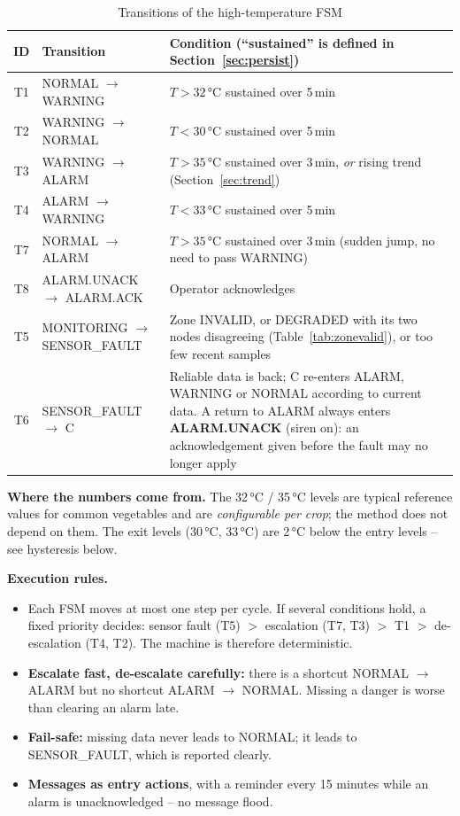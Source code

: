 \documentclass[11pt,a4paper]{report}
\newcommand{\why}[1]{\par\noindent\colorbox{gray!10}{\parbox{\dimexpr\linewidth-2\fboxsep}{\small\textbf{Where the numbers come from.} #1}}\par}
\begin{document}
\begin{table}[htbp]
\centering
\caption{Transitions of the high-temperature FSM}\label{tab:trans}
\small
\begin{tabularx}{\textwidth}{c >{\raggedright\arraybackslash}p{4.3cm} Y}
\toprule
\textbf{ID} & \textbf{Transition} & \textbf{Condition (``sustained'' is defined in Section~\ref{sec:persist})}\\
\midrule
T1 & NORMAL $\to$ WARNING & $T > 32$\,°C sustained over 5\,min\\
T2 & WARNING $\to$ NORMAL & $T < 30$\,°C sustained over 5\,min\\
T3 & WARNING $\to$ ALARM & $T > 35$\,°C sustained over 3\,min, \emph{or} rising trend (Section~\ref{sec:trend})\\
T4 & ALARM $\to$ WARNING & $T < 33$\,°C sustained over 5\,min\\
T7 & NORMAL $\to$ ALARM & $T > 35$\,°C sustained over 3\,min (sudden jump, no need to pass WARNING)\\
T8 & ALARM.UNACK $\to$ ALARM.ACK & Operator acknowledges\\
T5 & MONITORING $\to$ SENSOR\_FAULT & Zone INVALID, or DEGRADED with its two nodes disagreeing (Table~\ref{tab:zonevalid}), or too few recent samples\\
T6 & SENSOR\_FAULT $\to$ C & Reliable data is back; C re-enters ALARM, WARNING or NORMAL according to current data. A return to ALARM always enters \textbf{ALARM.UNACK} (siren on): an acknowledgement given before the fault may no longer apply\\
\bottomrule
\end{tabularx}
\end{table}

\why{The 32\,°C / 35\,°C levels are typical reference values for common vegetables and are \emph{configurable per crop}; the method does not depend on them. The exit levels (30\,°C, 33\,°C) are 2\,°C below the entry levels -- see hysteresis below.}

\textbf{Execution rules.}
\begin{itemize}[noitemsep]
  \item Each FSM moves at most one step per cycle. If several conditions hold, a fixed priority decides: sensor fault (T5) $>$ escalation (T7, T3) $>$ T1 $>$ de-escalation (T4, T2). The machine is therefore deterministic.
  \item \textbf{Escalate fast, de-escalate carefully:} there is a shortcut NORMAL $\to$ ALARM but no shortcut ALARM $\to$ NORMAL. Missing a danger is worse than clearing an alarm late.
  \item \textbf{Fail-safe:} missing data never leads to NORMAL; it leads to SENSOR\_FAULT, which is reported clearly.
  \item \textbf{Messages as entry actions}, with a reminder every 15 minutes while an alarm is unacknowledged -- no message flood.
\end{itemize}
\end{document}
